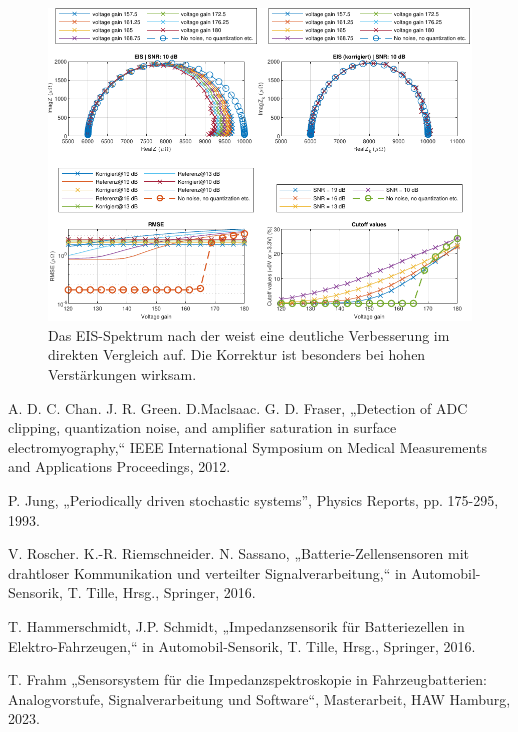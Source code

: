 \begin{figure}[bh!]
	\centering
	\includegraphics[width=.99\textwidth]{../img/ergebnisse.pdf}
	\caption{Das EIS-Spektrum nach der weist eine deutliche Verbesserung im direkten Vergleich auf. Die Korrektur ist besonders bei hohen Verstärkungen wirksam. }
	\label{fig:Ergebnisse} 
\end{figure}

   

\begin{thebibliography}{[99]}
	A. D. C. Chan. J. R. Green. D.Maclsaac. G. D. Fraser, „Detection of ADC clipping, quantization noise, and amplifier saturation in surface electromyography,“ IEEE International Symposium on Medical Measurements and Applications Proceedings, 2012.
	
	P. Jung, „Periodically driven stochastic systems”, Physics Reports,  pp. 175-295, 1993.
	
	V. Roscher. K.-R. Riemschneider. N. Sassano, „Batterie-Zellensensoren mit drahtloser Kommunikation und verteilter Signalverarbeitung,“ in Automobil-Sensorik, T. Tille, Hrsg., Springer, 2016.
	
	T. Hammerschmidt, J.P. Schmidt, „Impedanzsensorik für Batteriezellen in Elektro-Fahrzeugen,“ in Automobil-Sensorik, T. Tille, Hrsg., Springer, 2016.
	
	T. Frahm „Sensorsystem für die Impedanzspektroskopie in Fahrzeugbatterien: Analogvorstufe, Signalverarbeitung und Software“, Masterarbeit, HAW Hamburg, 2023.
	
\end{thebibliography}
	

 
 